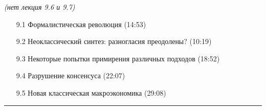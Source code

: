 \documentclass[a4paper]{article}
\begin{document}
{{\begin{description}
\begin{itemize}
\end{itemize}
\item[Week 9] \textsl{(нет лекция 9.6 и 9.7)}
\begin{itemize}
\item[9.1] Формалистическая революция (14:53)
\item[9.2] Неоклассический синтез: разногласия преодолены? (10:19)
\item[9.3] Некоторые попытки примирения различных подходов (18:52)
\item[9.4] Разрушение консенсуса (22:07)
\item[9.5] Новая классическая макроэкономика (29:08)
\end{itemize}
\end{description}}}
\hrule
\end{document}
